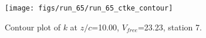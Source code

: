 \begin{figure}[H]
\centering
\texttt{[image: figs/run\_65/run\_65\_ctke\_contour]}
\caption{Contour plot of $k$ at $z/c$=10.00, $V_{free}$=23.23, station 7.}
\end{figure}



